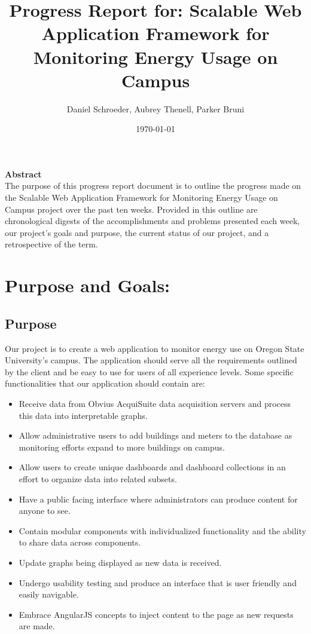 \documentclass[journal,10pt,onecolumn,compsoc]{IEEEtran} \usepackage[margin=1.0in]{geometry} \usepackage{pdfpages}
\title{Progress Report for: \linebreak Scalable Web Application Framework for Monitoring Energy Usage on Campus}
\author{Daniel Schroeder, Aubrey Thenell, Parker Bruni}
\date{\today}
\begin{document}
     \maketitle
     \vspace{2cm}
     \begin{center}
     \noindent \textbf{Abstract} \\
                 \indent The purpose of this progress report document is to outline the progress made on the Scalable Web Application Framework for Monitoring Energy Usage on Campus project over the past ten weeks. Provided in this outline are chronological digests of the accomplishments and problems presented each week, our project's goals and purpose, the current status of our project, and a retrospective of the term. 
     \end{center}         
     
     \newpage
    \tableofcontents
    \newpage
    \section{Purpose and Goals:}
    \subsection{Purpose} 
    Our project is to create a web application to monitor energy use on Oregon State University’s campus. The application should serve all the requirements outlined by the client and be easy to use for users of all experience levels.
    \noindent Some specific functionalities that our application should contain are:
    \begin{itemize}
        \item Receive data from Obvius AcquiSuite data acquisition servers and process this data into interpretable graphs.
        \item Allow administrative users to add buildings and meters to the database as monitoring efforts expand to more buildings on campus.
        \item Allow users to create unique dashboards and dashboard collections in an effort to organize data into related subsets.
        \item Have a public facing interface where administrators can produce content for anyone to see.
        \item Contain modular components with individualized functionality and the ability to share data across components.
        \item Update graphs being displayed as new data is received.
        \item Undergo usability testing and produce an interface that is user friendly and easily navigable.
        \item Embrace AngularJS concepts to inject content to the page as new requests are made.
    \end{itemize}
    
\end{document}
